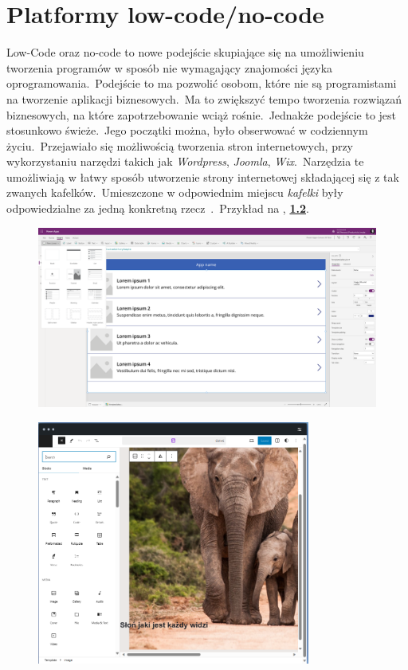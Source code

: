 \chapter{Platformy low-code/no-code}
Low-Code oraz no-code to nowe podejście skupiające się na umożliwieniu tworzenia programów w sposób nie wymagający znajomości języka oprogramowania.\ Podejście to ma pozwolić osobom, które nie są programistami na tworzenie aplikacji biznesowych.\ Ma to zwiększyć tempo tworzenia rozwiązań biznesowych, na które zapotrzebowanie wciąż rośnie.\ Jednakże podejście to jest stosunkowo świeże.\ Jego początki można, było obserwować w codziennym życiu.\ Przejawiało się możliwością tworzenia stron internetowych, przy wykorzystaniu narzędzi takich jak \textit{Wordpress}, \textit{Joomla}, \textit{Wix}.\ Narzędzia te umożliwiają w łatwy sposób utworzenie strony internetowej składającej się z tak zwanych kafelków.\ Umieszczone w odpowiednim miejscu \textit{kafelki} były odpowiedzialne za jedną konkretną rzecz~\cite{Wordpress2023, Joomla2023, Wix2023}.\ Przykład na , \textbf{\ref{fig:wp-plat}}.
\begin{figure}[H]
    \centering
    \includegraphics[width=\textwidth]{images/ms_powerapps}
    \label{fig:pa-plat}
\end{figure}

\vfill
\pagebreak

\begin{figure}[H]
    \centering
    \includegraphics[width=0.8\textwidth]{images/slon_wordpress}
    \label{fig:wp-plat}
\end{figure}

